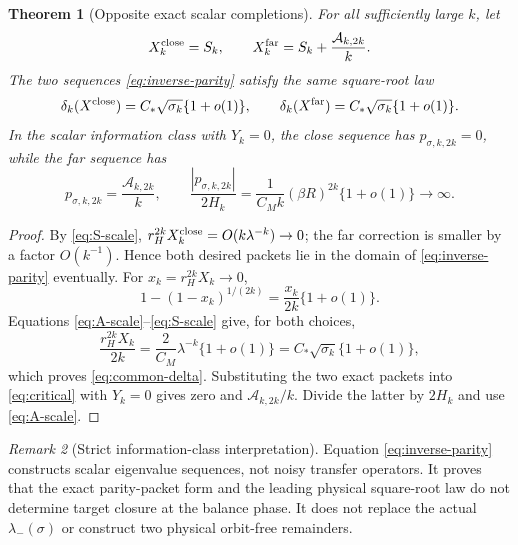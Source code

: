 \documentclass[11pt]{article}
\newtheorem{theorem}{Theorem}[section]
\theoremstyle{remark}
\newtheorem{remark}[theorem]{Remark}
\newcommand{\cA}{\mathcal A}
\begin{document}
\begin{theorem}[Opposite exact scalar completions]
\label{thm:scalar-completions}
For all sufficiently large $k$, let
\begin{equation}\label{eq:two-packets}
 X_k^{\rm close}=S_k,
 \qquad
 X_k^{\rm far}=S_k+\frac{\cA_{k,2k}}k.
\end{equation}
The two sequences \eqref{eq:inverse-parity} satisfy the same square-root law
\begin{equation}\label{eq:common-delta}
 \delta_k(X^{\rm close})
 =C_*\sqrt{\sigma_k}\{1+o(1)\},
 \qquad
 \delta_k(X^{\rm far})
 =C_*\sqrt{\sigma_k}\{1+o(1)\}.
\end{equation}
In the scalar information class with $Y_k=0$, the close sequence has
$p_{\sigma,k,2k}=0$, while the far sequence has
\begin{equation}\label{eq:far-residual}
 p_{\sigma,k,2k}=\frac{\cA_{k,2k}}k,
 \qquad
 \frac{|p_{\sigma,k,2k}|}{2H_k}
 =\frac1{C_Mk}(\beta R)^{2k}\{1+o(1)\}
 \longrightarrow\infty.
\end{equation}
\end{theorem}

\begin{proof}
By \eqref{eq:S-scale},
$r_H^{2k}X_k^{\rm close}=O(k\lambda^{-k})\to0$; the far correction is
smaller by a factor $O(k^{-1})$.  Hence both desired packets lie in the domain
of \eqref{eq:inverse-parity} eventually.  For $x_k=r_H^{2k}X_k\to0$,
\begin{equation}\label{eq:root-expansion}
 1-(1-x_k)^{1/(2k)}=\frac{x_k}{2k}\{1+o(1)\}.
\end{equation}
Equations \eqref{eq:A-scale}--\eqref{eq:S-scale} give, for both choices,
\[
 \frac{r_H^{2k}X_k}{2k}
 =\frac2{C_M}\lambda^{-k}\{1+o(1)\}
 =C_*\sqrt{\sigma_k}\{1+o(1)\},
\]
which proves \eqref{eq:common-delta}.  Substituting the two exact packets into
\eqref{eq:critical} with $Y_k=0$ gives zero and
$\cA_{k,2k}/k$.  Divide the latter by $2H_k$ and use
\eqref{eq:A-scale}.
\end{proof}

\begin{remark}[Strict information-class interpretation]
Equation \eqref{eq:inverse-parity} constructs scalar eigenvalue sequences,
not noisy transfer operators.  It proves that the exact parity-packet form
and the leading physical square-root law do not determine target closure at
the balance phase.  It does not replace the actual $\lambda_-(\sigma)$ or
construct two physical orbit-free remainders.
\end{remark}
\end{document}
